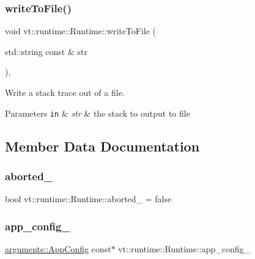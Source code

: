 \subsubsection{\texorpdfstring{write\+To\+File()}{writeToFile()}}
{\footnotesize\ttfamily void vt\+::runtime\+::\+Runtime\+::write\+To\+File (\begin{DoxyParamCaption}\item[{std\+::string const \&}]{str }\end{DoxyParamCaption})\hspace{0.3cm}{\ttfamily [static]}, {\ttfamily [private]}}



Write a stack trace out of a file. 


\begin{DoxyParams}[1]{Parameters}
\mbox{\tt in}  & {\em str} & the stack to output to file \\
\hline
\end{DoxyParams}


\subsection{Member Data Documentation}
\mbox{\label{structvt_1_1runtime_1_1_runtime_a19b9ad0859c6fb417b734ac1cc8be1a7}} 
\subsubsection{\texorpdfstring{aborted\+\_\+}{aborted\_}}
{\footnotesize\ttfamily bool vt\+::runtime\+::\+Runtime\+::aborted\+\_\+ = false\hspace{0.3cm}{\ttfamily [protected]}}

\mbox{\label{structvt_1_1runtime_1_1_runtime_a5fa2ceccc0e96fe0a97e0454e3a0a1ee}} 
\subsubsection{\texorpdfstring{app\+\_\+config\+\_\+}{app\_config\_}}
{\footnotesize\ttfamily \hyperlink{structvt_1_1arguments_1_1_app_config}{arguments\+::\+App\+Config} const$\ast$ vt\+::runtime\+::\+Runtime\+::app\+\_\+config\+\_\+\hspace{0.3cm}{\ttfamily [protected]}}

